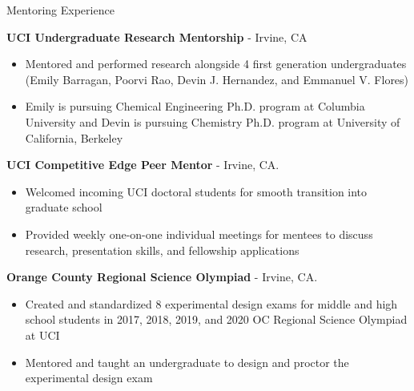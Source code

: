 \begin{rubric}{Mentoring Experience}
\begin{itemize}
   \end{itemize}
    \textbf{UCI Undergraduate Research Mentorship} - Irvine, CA
   \vspace{-0.5em}
   \begin{itemize}
     \itemsep-0.5em
   \item Mentored and performed research alongside 4 first generation undergraduates
     (Emily Barragan, Poorvi Rao, Devin J. Hernandez, and Emmanuel V. Flores)
   \item Emily is pursuing Chemical Engineering Ph.D. program at Columbia University and
     Devin is pursuing Chemistry Ph.D. program at University of California, Berkeley
     \vspace{-1em}
   \end{itemize}
   
    \textbf{UCI Competitive Edge Peer Mentor} - Irvine, CA.
   \vspace{-0.5em}
   \begin{itemize}
   \itemsep-0.5em
   \item Welcomed incoming UCI doctoral students for smooth transition into graduate school
   \item Provided weekly one-on-one individual meetings for mentees to discuss research, presentation
     skills, and fellowship applications
     \vspace{-1em}
   \end{itemize}
    \textbf{Orange County Regional Science Olympiad} - Irvine, CA.
   \vspace{-0.5em}
   \begin{itemize}
   \itemsep-0.5em
   \item Created and standardized 8 experimental design exams for middle and high school students in
     2017, 2018, 2019, and 2020 OC Regional Science Olympiad at UCI
   \item Mentored and taught an undergraduate to design and proctor the experimental design exam
     \vspace{-1em}
   \end{itemize}
\end{rubric}

%
